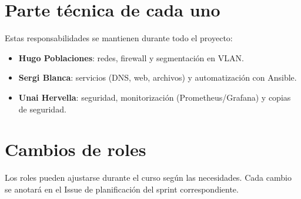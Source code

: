 \documentclass[12pt,a4paper]{article}
\begin{document}
\section{Parte técnica de cada uno}
Estas responsabilidades se mantienen durante todo el proyecto:
\begin{itemize}
  \item \textbf{Hugo Poblaciones}: redes, firewall y segmentación en VLAN.
  \item \textbf{Sergi Blanca}: servicios (DNS, web, archivos) y automatización con Ansible.
  \item \textbf{Unai Hervella}: seguridad, monitorización (Prometheus/Grafana) y copias de seguridad.
\end{itemize}

\section{Cambios de roles}
Los roles pueden ajustarse durante el curso según las necesidades. Cada cambio se anotará en el Issue de planificación del sprint correspondiente.
\end{document}
